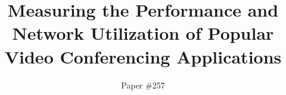 \documentclass[fontsize=10pt,conference=acm, submission]{confpaper}
\title{Measuring the Performance and Network Utilization of Popular Video Conferencing Applications}
\author{ Paper \#257}
\begin{document}
\begin{sloppypar}


\maketitle








\balance



\newpage
\balance\printbibliography




\end{sloppypar}
\end{document}
